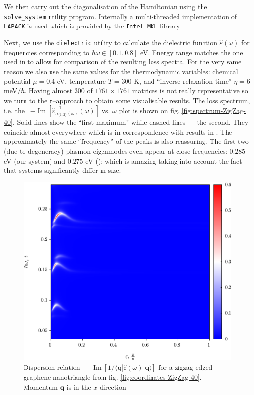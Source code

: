 \documentclass[a4paper,12pt]{article}
\begin{document}
    We then carry out the diagonalisation of the Hamiltonian using the \href{https://github.com/twesterhout/plasmon-cpp/blob/master/src/solve\_system.cpp}{\texttt{solve\_system}} utility program. Internally a multi-threaded implementation of \texttt{LAPACK} is used which is provided by the \texttt{Intel MKL} \cite{intel-mkl} library.
    
    Next, we use the \href{https://github.com/twesterhout/plasmon-cpp/blob/master/src/hello.cpp}{\texttt{dielectric}} utility to calculate the dielectric function $\hat\varepsilon(\omega)$ for frequencies corresponding to $\hbar\omega \in [0.1,0.8]$ eV. Energy range matches the one used in \cite{plasmonic2015} to allow for comparison of the resulting loss spectra. For the very same reason we also use the same values for the thermodynamic variables: chemical potential $\mu = 0.4$ eV, temperature $T = 300$ K, and ``inverse relaxation time'' $\eta = 6$ meV$\!/\hbar$. Having almost $300$ of $1761\times1761$ matrices is not really representative so we turn to the $\mathbf{r}$--approach to obtain some visualisable results. The loss spectrum, i.e. the \ $-\operatorname{Im}[\hat\varepsilon^{-1}_{n_{\{1, 2\}}(\omega)}(\omega)]$ vs. $\omega$ plot is shown on fig. \ref{fig:spectrum-ZigZag-40}. Solid lines show the ``first maximum'' while dashed lines --- the second. They coincide almost everywhere which is in correspondence with results in \cite{plasmonic2015}. The approximately the same ``frequency'' of the peaks is also reassuring. The first two (due to degeneracy) plasmon eigenmodes even appear at close frequencies: $0.285$ eV (our system) and $0.275$ eV (\!\!\cite{plasmonic2015}); which is amazing taking into account the fact that systems significantly differ in size.

    \begin{figure}[h] 
    \center
    \includegraphics[width=\textwidth]{Spectrum-ZigZag-40-Q-Omega.png}
    \caption{Dispersion relation \ $-\operatorname{Im}[1 / \langle\mathbf{q}| \hat\varepsilon(\omega) |\mathbf{q}\rangle]$ for a zigzag-edged graphene nanotriangle from fig. \ref{fig:coordinates-ZigZag-40}. Momentum $\mathbf{q}$ is in the $x$ direction.}
    \label{fig:spectrum-ZigZag-40-Q-Omega}
    \end{figure}
\end{document}
